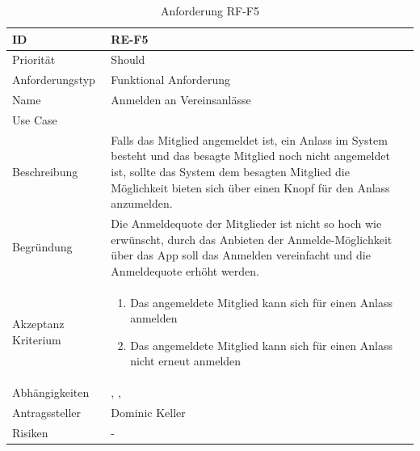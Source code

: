 \begin{table}[ht]
\centering
  \begin{tabular}{ l | p{8cm} }
	\hline
	\rowcolor{gray}
	ID 			&	\textbf{RE-F5}\\ \hline
	Priorität 		&	Should\\ \hline
	Anforderungstyp	&	Funktional Anforderung\\ \hline
	Name 			&	Anmelden an Vereinsanlässe\\ \hline
	Use Case 		&	\nameref{table:use_case_4}\\ \hline
	Beschreibung 	&	Falls das Mitglied angemeldet ist, ein Anlass im System besteht und das besagte Mitglied noch nicht angemeldet ist, sollte das System dem besagten Mitglied die Möglichkeit bieten sich über einen Knopf für den Anlass anzumelden.\\ \hline
	Begründung 		&	Die Anmeldequote der Mitglieder ist nicht so hoch wie erwünscht, durch das Anbieten der Anmelde-Möglichkeit über das App soll das Anmelden vereinfacht und die Anmeldequote erhöht werden.\\ \hline
	Akzeptanz Kriterium	&	\begin{enumerate}
					\item Das angemeldete Mitglied kann sich für einen Anlass anmelden
					\item Das angemeldete Mitglied kann sich für einen Anlass nicht erneut anmelden
					\end{enumerate}
					\\ \hline
	Abhängigkeiten 	&	\nameref{table:req_1}, \nameref{table:req_2}, \nameref{table:req_3}\\ \hline
	Antragssteller 	&	Dominic Keller\\ \hline
	Risiken	 	&	-
  \end{tabular}
   \caption{Anforderung RF-F5}\label{table:req_5}
\end{table}

